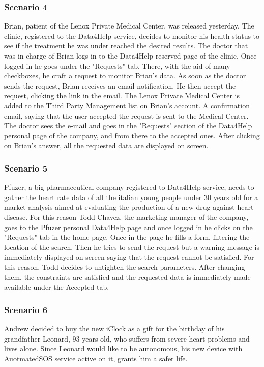 \subsubsection{Scenario 4}
Brian, patient of the Lenox Private Medical Center, was released  yesterday. The clinic, registered to the Data4Help service, decides to monitor his health status to see if the treatment he was under reached the desired results.
The doctor that was in charge of Brian logs in to the Data4Help reserved page of the clinic. Once logged in he goes under the "Requests" tab. There, with the aid of many checkboxes, he craft a request to monitor Brian's data.
As soon as the doctor sends the request, Brian receives an email notification. He then accept the request, clicking the link in the email. The Lenox Private Medical Center is added to the Third Party Management list on Brian's account. A confirmation email, saying that the user accepted the request is sent to the Medical Center. 
The doctor sees the e-mail and goes in the "Requests" section of the Data4Help personal page of the company, and from there to the accepted ones. After clicking on Brian's answer, all the requested data are displayed on screen.
\subsubsection{Scenario 5}
Pfuzer, a big pharmaceutical company registered to Data4Help service, needs to gather the heart rate data of all the italian young people under 30 years old for a market analysis aimed at evaluating the production of a new drug against heart disease. For this reason Todd Chavez, the marketing manager of the company, goes to the Pfuzer personal Data4Help page and once logged  in he clicks on the "Requests" tab in the home page. Once in the page he fills a form, filtering the location of the search. Then he tries to send the request but a warning message is immediately displayed on screen saying that the request cannot be satisfied. For this reason, Todd decides to untighten the search parameters. After changing them, the constraints are satisfied and the requested data is immediately made available under the Accepted tab.
\subsubsection{Scenario 6}
Andrew decided to buy the new iClock as a gift for the birthday of his grandfather Leonard, 93
years old, who suffers from severe heart problems and lives alone. Since Leonard would like to be autonomous, his new device with AuotmatedSOS service active on it, grants him a safer life.

